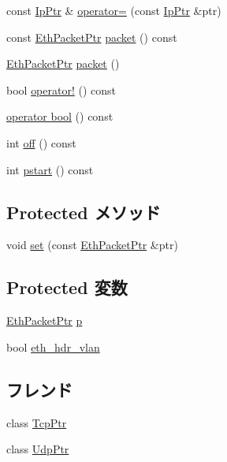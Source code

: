 \begin{DoxyCompactItemize}
\item 
const \hyperlink{classNet_1_1IpPtr}{IpPtr} \& \hyperlink{classNet_1_1IpPtr_a292e63bcdaae09f0b23fc198ca8fcac1}{operator=} (const \hyperlink{classNet_1_1IpPtr}{IpPtr} \&ptr)
\item 
const \hyperlink{classRefCountingPtr}{EthPacketPtr} \hyperlink{classNet_1_1IpPtr_a13e32a6fa7b2f1b41d1d8dc32d8fda9e}{packet} () const 
\item 
\hyperlink{classRefCountingPtr}{EthPacketPtr} \hyperlink{classNet_1_1IpPtr_a549ac5c293e8047f1be38ca356e160da}{packet} ()
\item 
bool \hyperlink{classNet_1_1IpPtr_ac8b1d32dbd52d431450c70b151cfa205}{operator!} () const 
\item 
\hyperlink{classNet_1_1IpPtr_aa385aa18f5e42db5a415c25a90f4193d}{operator bool} () const 
\item 
int \hyperlink{classNet_1_1IpPtr_a81fa7ab0c6e92d4496ee915a8a3705f9}{off} () const 
\item 
int \hyperlink{classNet_1_1IpPtr_ae6fc8073bc02ff3fd03030e0936d56eb}{pstart} () const 
\end{DoxyCompactItemize}
\subsection*{Protected メソッド}
\begin{DoxyCompactItemize}
\item 
void \hyperlink{classNet_1_1IpPtr_af1faec8f5ac9a74b80fa6ce84b17a7c6}{set} (const \hyperlink{classRefCountingPtr}{EthPacketPtr} \&ptr)
\end{DoxyCompactItemize}
\subsection*{Protected 変数}
\begin{DoxyCompactItemize}
\item 
\hyperlink{classRefCountingPtr}{EthPacketPtr} \hyperlink{classNet_1_1IpPtr_a764b18a7236ca83fd4bd750516da7d09}{p}
\item 
bool \hyperlink{classNet_1_1IpPtr_a0d4c03dd0e48319a9a4c5f4148c8a496}{eth\_\-hdr\_\-vlan}
\end{DoxyCompactItemize}
\subsection*{フレンド}
\begin{DoxyCompactItemize}
\item 
class \hyperlink{classNet_1_1IpPtr_aaa26166329482f65ba88b88bb72b04ed}{TcpPtr}
\item 
class \hyperlink{classNet_1_1IpPtr_ae00019f223a3b97d7f64791d15e438e5}{UdpPtr}
\end{DoxyCompactItemize}


